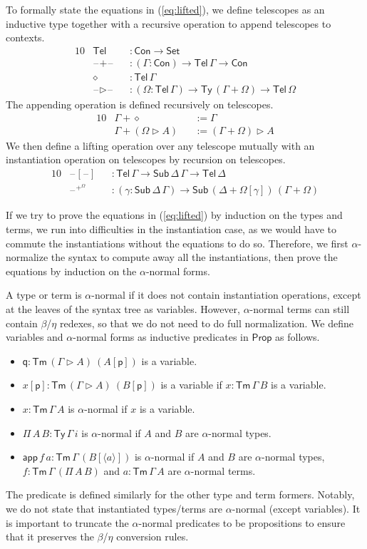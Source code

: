 \documentclass[sigplan,10pt,anonymous,review]{acmart}\settopmatter{printfolios=true,printccs=false,printacmref=false}
\newcommand{\ra}{\rightarrow}
\newcommand{\Set}{\mathsf{Set}}
\newcommand{\Prop}{\mathsf{Prop}}
\newcommand{\Ty}{\mathsf{Ty}}
\newcommand{\Tm}{\mathsf{Tm}}
\newcommand{\Con}{\mathsf{Con}}
\newcommand{\Sub}{\mathsf{Sub}}
\newcommand{\Tel}{\mathsf{Tel}}
\newcommand{\p}{\mathsf{p}}
\newcommand{\q}{\mathsf{q}}
\newcommand{\ext}{\mathop{\triangleright}}
\newcommand{\app}{\mathsf{app}}
\newcommand{\blank}{\mathord{\hspace{1pt}\text{--}\hspace{1pt}}} %
\begin{document}
To formally state the equations in (\ref{eq:lifted}), we define telescopes as an
inductive type together with a recursive operation to append telescopes to
contexts.
\begin{alignat*}{10}
  & \Tel && : \Con\ra\Set \\
  & \blank+\blank && : (\Gamma:\Con)\ra\Tel\,\Gamma\ra\Con \\
  & \diamond && : \Tel\,\Gamma \\
  & \blank\ext\blank && : (\Omega:\Tel\,\Gamma)\ra\Ty\,(\Gamma+\Omega)\ra\Tel\,\Omega
\end{alignat*}
The appending operation is defined recursively on telescopes.
\begin{alignat*}{10}
  & \Gamma+\diamond && := \Gamma \\
  & \Gamma+(\Omega\ext A) && := (\Gamma+\Omega)\ext A
\end{alignat*}
We then define a lifting operation over any telescope mutually with an
instantiation operation on telescopes by recursion on telescopes.
\begin{alignat*}{10}
  & \blank[\blank] && : \Tel\,\Gamma\ra\Sub\,\Delta\,\Gamma\ra\Tel\,\Delta \\
  & \blank^{+^\Omega} && : (\gamma:\Sub\,\Delta\,\Gamma)\ra\Sub\,(\Delta+\Omega[\gamma])\,(\Gamma+\Omega)
\end{alignat*}

If we try to prove the equations in (\ref{eq:lifted}) by induction on the types
and terms, we run into difficulties in the instantiation case, as we would have
to commute the instantiations without the equations to do so. Therefore, we
first $\alpha$-normalize the syntax to compute away all the instantiations, then
prove the equations by induction on the $\alpha$-normal forms.

A type or term is $\alpha$-normal if it does not contain instantiation
operations, except at the leaves of the syntax tree as variables. However,
$\alpha$-normal terms can still contain $\beta$/$\eta$ redexes, so that we do
not need to do full normalization. We define variables and $\alpha$-normal forms
as inductive predicates in $\Prop$ as follows.
\begin{itemize}
  \item $\q:\Tm\,(\Gamma\ext A)\ (A[\p])$ is a variable.
  \item $x[\p]:\Tm\,(\Gamma\ext A)\ (B[\p])$ is a variable if $x:\Tm\,\Gamma\,B$
  is a variable.
  \item $x:\Tm\,\Gamma\,A$ is $\alpha$-normal if $x$ is a variable.
  \item $\Pi\,A\,B:\Ty\,\Gamma\,i$ is $\alpha$-normal if $A$ and $B$ are
  $\alpha$-normal types.
  \item $\app\,f\,a:\Tm\,\Gamma\,(B[\langle a \rangle])$ is $\alpha$-normal if
  $A$ and $B$ are $\alpha$-normal types, $f:\Tm\,\Gamma\,(\Pi\,A\,B)$ and
  $a:\Tm\,\Gamma\,A$ are $\alpha$-normal terms.
\end{itemize}
The predicate is defined similarly for the other type and term formers. Notably,
we do not state that instantiated types/terms are $\alpha$-normal (except variables). It is
important to truncate the $\alpha$-normal predicates to be propositions to
ensure that it preserves the $\beta$/$\eta$ conversion rules.
\end{document}
